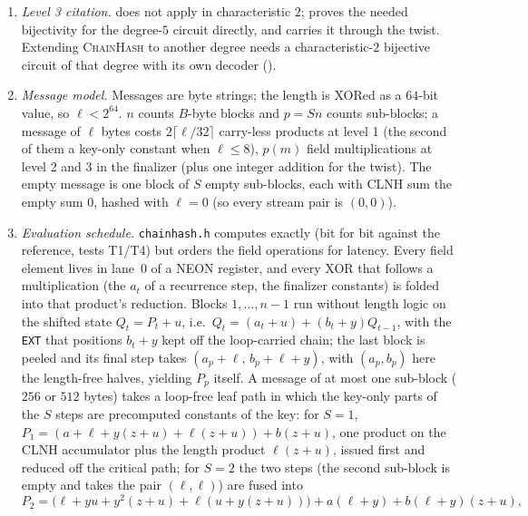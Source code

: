 \begin{remark}
\begin{enumerate}[label=(A\arabic*)]
      total-degree bound $n/|\F|$ stated at the end of that proof is
      (iii) with .
\item \emph{Level 3 citation.}   does not apply in characteristic $2$;
       proves the needed bijectivity for the degree-$5$
      circuit directly, and  carries it through the twist.  Extending \textsc{ChainHash} to another degree needs
      a characteristic-$2$ bijective circuit of that degree with its own
      decoder ().
\item \emph{Message model.}  Messages are byte strings; the length is XORed as
      a $64$-bit value, so $\ell<2^{64}$.  $n$ counts $B$-byte blocks and
      $p=Sn$ counts sub-blocks; a message of $\ell$ bytes costs
      $2\lceil\ell/32\rceil$ carry-less products at level 1 (the second of
      them a key-only constant when $\ell\le8$), $p(m)$ field
      multiplications at level 2 and $3$ in the finalizer (plus one integer
      addition for the twist).  The empty message
      is one block of $S$ empty sub-blocks, each with CLNH sum the empty sum
      $0$, hashed with $\ell=0$ (so every stream pair is $(0,0)$).
\item \emph{Evaluation schedule.}  \texttt{chainhash.h} computes
       exactly (bit for bit against the reference, tests
      T1/T4) but orders the field operations for latency.  Every field
      element lives in lane~$0$ of a NEON register, and every XOR that follows
      a multiplication (the $a_t$ of a recurrence step, the finalizer
      constants) is folded into that product's reduction.  Blocks
      $1,\dots,n-1$ run without length logic on the shifted state
      $Q_t=P_t+u$, i.e.\ $Q_t=(a_t+u)+(b_t+y)Q_{t-1}$, with the \texttt{EXT}
      that positions $b_t+y$ kept off the loop-carried chain; the last block
      is peeled and its final step takes $(a_p+\ell,\,b_p+\ell+y)$, with
      $(a_p,b_p)$ here the length-free halves, yielding
      $P_p$ itself.  A message of at most one sub-block ($256$ or $512$
      bytes) takes a loop-free leaf path in which the key-only parts of the
      $S$ steps are precomputed constants of the key: for $S=1$,
      $P_1=(a+\ell+y(z+u)+\ell(z+u))+b(z+u)$, one product on the CLNH
      accumulator plus the length product $\ell(z+u)$, issued first and
      reduced off the critical path; for $S=2$ the two steps (the second
      sub-block is empty and takes the pair $(\ell,\ell)$) are fused into
      \[
        P_2=\bigl(\ell+yu+y^2(z+u)+\ell(u+y(z+u))\bigr)+a(\ell+y)+b(\ell+y)(z+u),
\]
\end{enumerate}
\end{remark}
